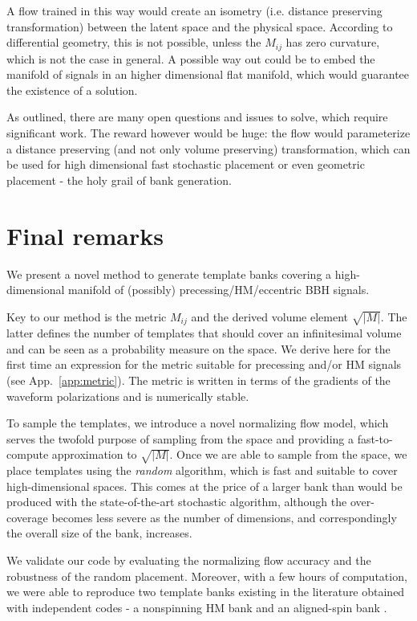 \documentclass[twocolumn,showpacs,preprintnumbers,nofootinbib,prd,
superscriptaddress,10pt]{revtex4-2}
\begin{document}
A flow trained in this way would create an isometry (i.e. distance preserving transformation) between the latent space and the physical space. According to differential geometry, this is not possible, unless the $M_{ij}$ has zero curvature, which is not the case in general. A possible way out could be to embed the manifold of signals in an higher dimensional flat manifold, which would guarantee the existence of a solution.

As outlined, there are many open questions and issues to solve, which require significant work. The reward however would be huge: the flow would parameterize a distance preserving (and not only volume preserving) transformation, which can be used for high dimensional fast stochastic placement or even geometric placement - the holy grail of bank generation.

\section{Final remarks} \label{sec:conclusion}

We present a novel method to generate template banks covering a high-dimensional manifold of (possibly) precessing/HM/eccentric BBH signals.

Key to our method is the metric $M_{ij}$ and the derived volume element $\sqrt{|M|}$. The latter defines the number of templates that should cover an infinitesimal volume and can be seen as a probability measure on the space.
We derive here for the first time an expression for the metric suitable for precessing and/or HM signals (see App.~\ref{app:metric}). The metric is written in terms of the gradients of the waveform polarizations and is numerically stable.

To sample the templates, we introduce a novel normalizing flow model, which serves the twofold purpose of sampling from the space and providing a fast-to-compute approximation to $\sqrt{|M|}$.
Once we are able to sample from the space, we place templates using the {\it random} algorithm, which is fast and suitable to cover high-dimensional spaces.
This comes at the price of a larger bank than would be produced with the state-of-the-art stochastic algorithm, although the over-coverage becomes less severe as the number of dimensions, and correspondingly the overall size of the bank, increases.

We validate our code by evaluating the normalizing flow accuracy and the robustness of the random placement.
Moreover, with a few hours of computation, we were able to reproduce two template banks existing in the literature obtained with independent codes - a nonspinning HM bank \cite{Harry:2017weg} and an aligned-spin bank \cite{Sakon:2022ibh}.
\end{document}
